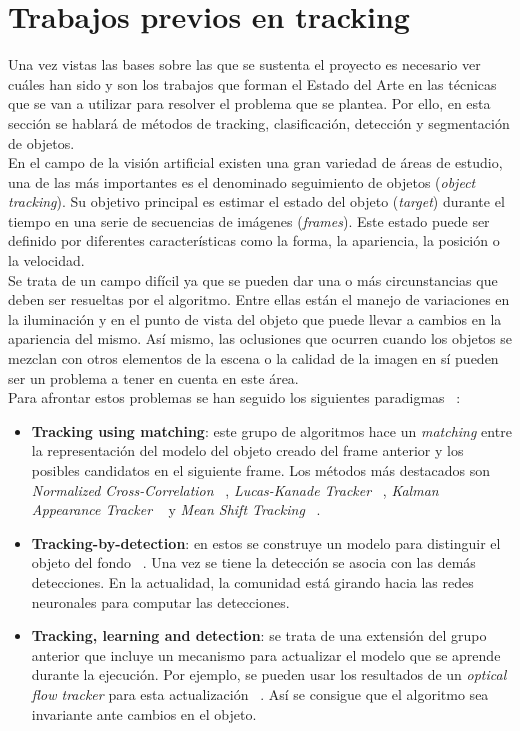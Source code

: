 \documentclass{bmvc2k}
\begin{document}
\section{Trabajos previos en tracking}
Una vez vistas las bases sobre las que se sustenta el proyecto es necesario ver cuáles han sido y son los trabajos que forman el Estado del Arte en las técnicas que se van a utilizar para resolver el problema que se plantea. Por ello, en esta sección se hablará de métodos de tracking, clasificación, detección y segmentación de objetos.\\
En el campo de la visión artificial existen una gran variedad de áreas de estudio, una de las más importantes es el denominado seguimiento de objetos (\textit{object tracking}). Su objetivo principal es estimar el estado del objeto (\textit{target}) durante el tiempo en una serie de secuencias de imágenes (\textit{frames}). Este estado puede ser definido por diferentes características como la forma, la apariencia, la posición o la velocidad.\\
Se trata de un campo difícil ya que se pueden dar una o más circunstancias que deben ser resueltas por el algoritmo. Entre ellas están el manejo de variaciones en la iluminación y en el punto de vista del objeto que puede llevar a cambios en la apariencia del mismo. Así mismo, las oclusiones que ocurren cuando los objetos se mezclan con otros elementos de la escena o la calidad de la imagen en sí pueden ser un problema a tener en cuenta en este área.\\
Para afrontar estos problemas se han seguido los siguientes paradigmas ~\cite{smeulders2014visual}:
\begin{itemize}
\item \textbf{Tracking using matching}: este grupo de algoritmos hace un \textit{matching} entre la representación del modelo del objeto creado del frame anterior y los posibles candidatos en el siguiente frame. Los métodos más destacados son \textit{Normalized Cross-Correlation} ~\cite{briechle2001template}, \textit{Lucas-Kanade Tracker} ~\cite{baker2004lucas}, \textit{Kalman Appearance Tracker} ~\cite{nguyen2004fast} y \textit{Mean Shift Tracking} ~\cite{comaniciu2000real}.
\item \textbf{Tracking-by-detection}: en estos se construye un modelo para distinguir el objeto del fondo ~\cite{nguyen2006robust}. Una vez se tiene la detección se asocia con las demás detecciones. En la actualidad, la comunidad está girando hacia las redes neuronales para computar las detecciones.
\item \textbf{Tracking, learning and detection}: se trata de una extensión del grupo anterior que incluye un mecanismo para actualizar el modelo que se aprende durante la ejecución. Por ejemplo, se pueden usar los resultados de un \textit{optical flow tracker} para esta actualización ~\cite{kalal2010pn}. Así se consigue que el algoritmo sea invariante ante cambios en el objeto. 
\end{itemize}
\end{document}
